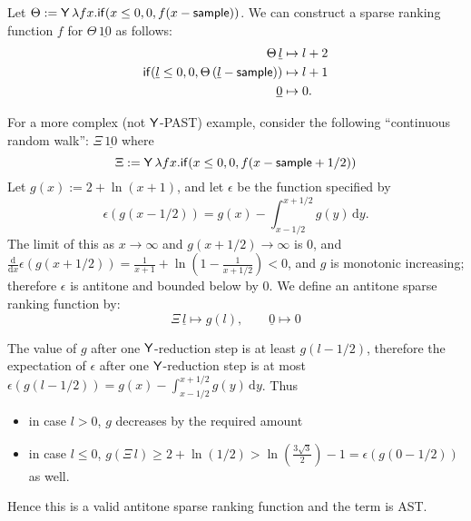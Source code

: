 \begin{example}
\label{ex:raven complex}
Let $\Theta := \mathsf{Y} \, \lambda f x . \mathsf{if}(x \leq 0, 0, f(x - \mathsf{sample}))$. 
We can construct a sparse ranking function $f$ for $\Theta \, \underline{10}$ as follows:
\begin{align*}
\Theta \, \underline l 
&\mapsto 
l + 2
\\
\mathsf{if}(\underline l \leq 0, 0, \Theta \, (\underline l - \mathsf{sample}))
&\mapsto
l + 1
\\
\underline 0 &\mapsto 0.
\end{align*}

For a more complex (not $\mathsf{Y}$-PAST) example, consider the following ``continuous random walk'': $\Xi \, \underline{10}$ where
\[
\Xi := \mathsf{Y} \, \lambda f x . \mathsf{if}(x \leq 0, 0, f(x - \mathsf{sample} + 1/2)) 
\]
Let $g(x) := 2 + \ln(x + 1)$, and let $\epsilon$ be the function specified by
\[
\epsilon(g(x-1/2)) = g(x) - \int_{x-1/2}^{x+1/2}g(y) \, \mathrm d y.
\]
The limit of this as $x \to \infty$ and $g(x+1/2) \to \infty$ is 0, and $\frac {\mathrm d}{\mathrm dx} \epsilon(g(x+1/2)) = \frac 1 {x+1} + \ln(1 - \frac 1 {x + 1/2}) < 0$, and $g$ is monotonic increasing; 
therefore $\epsilon$ is antitone and bounded below by 0.
We define an antitone sparse ranking function by:
\[
\Xi \, \underline l 
\mapsto 
g(l), \qquad 
\underline 0 \mapsto 0
\]

The value of $g$ after one $\mathsf{Y}$-reduction step is at least $g(l-1/2)$, therefore the expectation of $\epsilon$ after one $\mathsf{Y}$-reduction step is at most $\epsilon(g(l-1/2)) = g(x) - \int_{x-1/2}^{x+1/2}g(y) \, \mathrm d y$. 
Thus 
\begin{itemize}
\item in case $l > 0$, $g$ decreases by the required amount
\item in case $l \leq 0$, 
\(
g(\Xi \, l) \geq 2 + \ln(1/2) > \ln(\frac{3 \sqrt 3} 2) - 1 = \epsilon(g(0-1/2))
\) 
as well.
\end{itemize}
Hence this is a valid antitone sparse ranking function and the term is AST.
\end{example}

